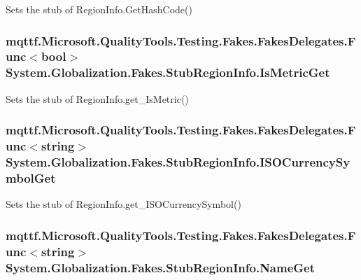 Sets the stub of Region\-Info.\-Get\-Hash\-Code()

\hypertarget{class_system_1_1_globalization_1_1_fakes_1_1_stub_region_info_ae8fadd795c275007b0d6323d8e17ada9}{
\subsubsection[{Is\-Metric\-Get}]{\setlength{\rightskip}{0pt plus 5cm}mqttf.\-Microsoft.\-Quality\-Tools.\-Testing.\-Fakes.\-Fakes\-Delegates.\-Func$<$bool$>$ System.\-Globalization.\-Fakes.\-Stub\-Region\-Info.\-Is\-Metric\-Get}}\label{class_system_1_1_globalization_1_1_fakes_1_1_stub_region_info_ae8fadd795c275007b0d6323d8e17ada9}


Sets the stub of Region\-Info.\-get\-\_\-\-Is\-Metric()

\hypertarget{class_system_1_1_globalization_1_1_fakes_1_1_stub_region_info_a6c340e979f4d639010b7b03918cf7651}{
\subsubsection[{I\-S\-O\-Currency\-Symbol\-Get}]{\setlength{\rightskip}{0pt plus 5cm}mqttf.\-Microsoft.\-Quality\-Tools.\-Testing.\-Fakes.\-Fakes\-Delegates.\-Func$<$string$>$ System.\-Globalization.\-Fakes.\-Stub\-Region\-Info.\-I\-S\-O\-Currency\-Symbol\-Get}}\label{class_system_1_1_globalization_1_1_fakes_1_1_stub_region_info_a6c340e979f4d639010b7b03918cf7651}


Sets the stub of Region\-Info.\-get\-\_\-\-I\-S\-O\-Currency\-Symbol()

\hypertarget{class_system_1_1_globalization_1_1_fakes_1_1_stub_region_info_a05367fe648f6f9f8c473ea79849ac7c1}{
\subsubsection[{Name\-Get}]{\setlength{\rightskip}{0pt plus 5cm}mqttf.\-Microsoft.\-Quality\-Tools.\-Testing.\-Fakes.\-Fakes\-Delegates.\-Func$<$string$>$ System.\-Globalization.\-Fakes.\-Stub\-Region\-Info.\-Name\-Get}}\label{class_system_1_1_globalization_1_1_fakes_1_1_stub_region_info_a05367fe648f6f9f8c473ea79849ac7c1}


